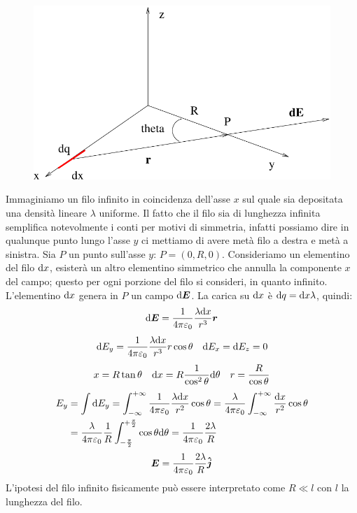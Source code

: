 \begin{Es}
\begin{figure}[htbp]
\centering
\includegraphics[scale=0.6]{immagini/fisica2/filo_inf}
\end{figure}
Im\-ma\-gi\-nia\-mo un filo infinito in coincidenza dell'asse $x$ sul quale sia depositata una densità lineare $\lambda$ uniforme. Il fatto che il filo sia di lunghezza infinita semplifica notevolmente i conti per motivi di simmetria, infatti possiamo dire in qualunque punto lungo l'asse $y$ ci mettiamo di avere metà filo a destra e metà a sinistra. Sia $P$ un punto sull'asse $y$: $P=(0,R,0)$. Consideriamo un elementino del filo $\mathrm{d} x$, esisterà un altro elementino simmetrico che annulla la componente $x$ del campo; questo per ogni porzione del filo si consideri, in quanto infinito. L'elementino $\mathrm{d} x$ genera in $P$ un campo $\mathrm{d} \boldsymbol{E}$. La carica su $\mathrm{d} x$ è $\mathrm{d} q=\mathrm{d} x\lambda$, quindi:
\begin{equation*}\mathrm{d}\boldsymbol{E}=\frac{1}{4\pi\varepsilon_0}\frac{\lambda\mathrm{d} x}{r^3}\boldsymbol{r}\end{equation*}
\begin{equation*}\mathrm{d} E_y=\frac{1}{4\pi\varepsilon_0}\frac{\lambda\mathrm{d} x}{r^3}r\cos\theta\quad \mathrm{d} E_x=\mathrm{d} E_z=0\end{equation*}
\begin{equation*}x=R\tan\theta\quad\mathrm{d} x=R\frac{1}{\cos^2\theta}\mathrm{d}\theta\quad r=\frac{R}{\cos\theta}\end{equation*}
\begin{align*}E_y&=\int\mathrm{d} E_y=\int_{-\infty}^{+\infty}\frac{1}{4\pi\varepsilon_0}\frac{\lambda\mathrm{d} x}{r^2}\cos\theta=\frac{\lambda}{4\pi\varepsilon_0}\int_{-\infty}^{+\infty}\frac{\mathrm{d} x}{r^2}\cos\theta\\
&=\frac{\lambda}{4\pi\varepsilon_0}\frac{1}{R}\int_{-\frac{\pi}{2}}^{+\frac{\pi}{2}}\cos\theta\mathrm{d}\theta=\frac{1}{4\pi\varepsilon_0}\frac{2\lambda}{R}
\end{align*}
\begin{equation*}\boldsymbol{E}=\frac{1}{4\pi\varepsilon_0}\frac{2\lambda}{R}\boldsymbol{\hat {j}}\end{equation*}
L'ipotesi del filo infinito fisicamente può essere interpretato come $R\ll l$ con $l$ la lunghezza del filo.
\end{Es}
